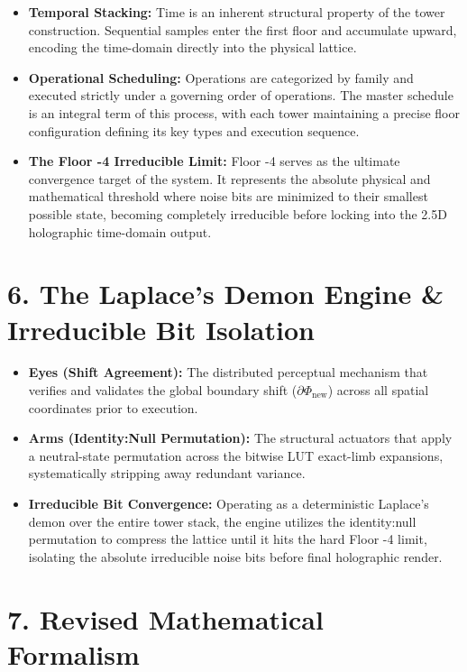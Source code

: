 \begin{itemize}
\item \textbf{Temporal Stacking:} Time is an inherent structural property of the tower construction. Sequential samples enter the first floor and accumulate upward, encoding the time-domain directly into the physical lattice.
\item \textbf{Operational Scheduling:} Operations are categorized by family and executed strictly under a governing order of operations. The master schedule is an integral term of this process, with each tower maintaining a precise floor configuration defining its key types and execution sequence.
\item \textbf{The Floor -4 Irreducible Limit:} Floor -4 serves as the ultimate convergence target of the system. It represents the absolute physical and mathematical threshold where noise bits are minimized to their smallest possible state, becoming completely irreducible before locking into the 2.5D holographic time-domain output.
\end{itemize}

\medskip

\section{\texorpdfstring{6. The Laplace’s Demon Engine \& Irreducible Bit Isolation}{6. The Laplace’s Demon Engine \& Irreducible Bit Isolation}}

\begin{itemize}
\item \textbf{Eyes (Shift Agreement):} The distributed perceptual mechanism that verifies and validates the global boundary shift (\(\partial\Phi_{\text{new}}\)) across all spatial coordinates prior to execution.
\item \textbf{Arms (Identity:Null Permutation):} The structural actuators that apply a neutral-state permutation across the bitwise LUT exact-limb expansions, systematically stripping away redundant variance.
\item \textbf{Irreducible Bit Convergence:} Operating as a deterministic Laplace’s demon over the entire tower stack, the engine utilizes the identity:null permutation to compress the lattice until it hits the hard Floor -4 limit, isolating the absolute irreducible noise bits before final holographic render.
\end{itemize}

\medskip

\section{\texorpdfstring{7. Revised Mathematical Formalism}{7. Revised Mathematical Formalism}}

